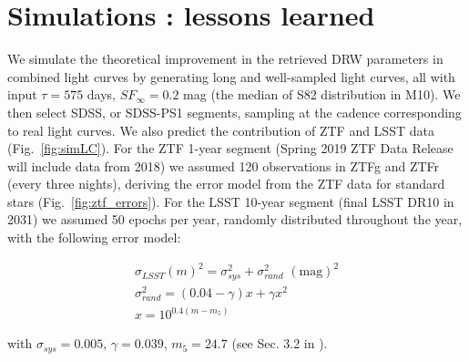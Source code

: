 \documentclass[twocolumn]{aastex62}
\begin{document}

%
%
%
%
%

\section{Simulations : lessons learned}\label{sec:simulation}

We simulate the theoretical improvement in the retrieved DRW parameters in combined light curves by generating long and well-sampled light curves, all with input $\tau = 575 $ days, $SF_{\infty} = 0.2$ mag (the median of S82 distribution in M10). We then select SDSS, or SDSS-PS1 segments, sampling at the cadence corresponding to real light curves. We also predict the contribution of ZTF and LSST data (Fig.~\ref{fig:simLC}). For the ZTF 1-year segment (Spring 2019 ZTF Data Release will include data from 2018) we assumed 120 observations in ZTFg and ZTFr (every three nights), deriving the error model from the ZTF data for standard stars (Fig.~\ref{fig:ztf_errors}). For the LSST 10-year segment (final LSST DR10 in 2031) we assumed 50 epochs per year, randomly distributed throughout the year, with the following error model:

\begin{eqnarray}
\sigma_{LSST}(m)^{2} = \sigma_{sys}^{2} + \sigma_{rand}^{2} \,\, \mathrm{(mag)}^{2}\\
\sigma_{rand}^{2} = (0.04-\gamma)x + \gamma x^{2} \\
x = 10^{0.4(m-m_{5})}
\end{eqnarray}

with  $\sigma_{sys} = 0.005$, $\gamma=0.039$, $m_{5} = 24.7$ (see Sec. 3.2 in \citet{ivezic2019}).

\begin{figure*}%
\caption{Simulated DRW process sampled at the real cadence of SDSS, PS1 segments for quasar SDSSdbID=1072282,  adding the simulated LSST segment. The well-sampled true DRW signal was first sampled at SDSS-PS1-LSST cadences, and then Gaussian offset was added to each point to simulate observational noise. }
\label{fig:simLC}
\end{figure*} 
\end{document}
